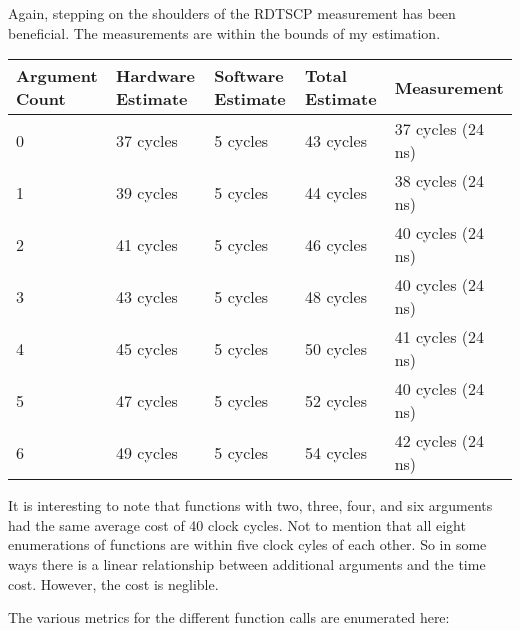 \documentclass[paper=a4, fontsize=11pt]{scrartcl}
\numberwithin{equation}{section}        %
\numberwithin{figure}{section}          %
\numberwithin{table}{section}               %
\begin{document}
Again, stepping on the shoulders of the RDTSCP measurement has been beneficial.  The measurements are within the bounds of my estimation.

\begin{center}
    \begin{tabular}{ | l| l | l | l | l |}
    \hline
    Argument Count & Hardware Estimate & Software Estimate & Total Estimate & Measurement \\ \hline
    0 & 37 cycles & 5 cycles & 43 cycles & 37 cycles (24 ns) \\ \hline
    1 & 39 cycles & 5 cycles & 44 cycles & 38 cycles (24 ns) \\  \hline
    2 & 41 cycles & 5 cycles & 46 cycles & 40 cycles (24 ns) \\  \hline
    3 & 43 cycles & 5 cycles & 48 cycles & 40 cycles (24 ns) \\  \hline
    4 & 45 cycles & 5 cycles & 50 cycles & 41 cycles (24 ns) \\  \hline
    5 & 47 cycles & 5 cycles & 52 cycles & 40 cycles (24 ns) \\  \hline
    6 & 49 cycles & 5 cycles & 54 cycles & 42 cycles (24 ns) \\ 
    \hline
    \end{tabular}
\end{center}

It is interesting to note that functions with two, three, four, and six arguments had the same average cost of 40 clock cycles.  Not to mention that all eight enumerations of functions are within five clock cyles of each other.  So in some ways there is a linear relationship between additional arguments and the time cost.  However, the cost is neglible.

The various metrics for the different function calls are enumerated here:
\end{document}
